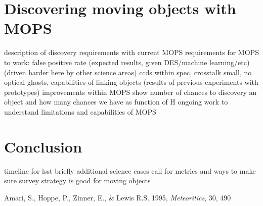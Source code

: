 \documentclass{iau}
\begin{document}
\section{Discovering moving objects with MOPS}
description of discovery requirements with current MOPS
requirements for MOPS to work:
 false positive rate (expected results, given DES/machine
 learning/etc) (driven harder here by other science areas)
   ccds within spec, crosstalk small, no optical ghosts, 
 capabilities of linking objects (results of previous experiments with
 prototypes)  improvements within MOPS
show number of chances to discovery an object and how many chances we
have as function of H 
ongoing work to understand limitations and capabilities of MOPS

\section{Conclusion}
timeline for lsst
briefly additional science cases
call for metrics and ways to make sure survey strategy is good for
moving objects



\begin{thebibliography}{}

{Amari, S., Hoppe, P., Zinner, E., \& Lewis R.S.} 1995,
\textit{Meteoritics}, 30, 490 

\end{thebibliography}

\end{document}
